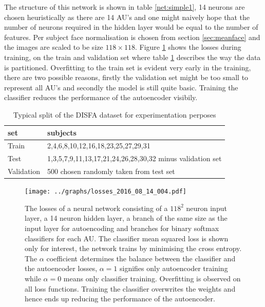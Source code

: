     The structure of this network is shown in table \ref{net:simple1}, 14 neurons
    are chosen heuristically as there are 14 AU's and one might naively hope that the number of
    neurons required in the hidden layer would be equal to the number of features. Per subject face normalisation
    is chosen from section \ref{sec:meanface} and the images are scaled to be size $118 \times 118$.
    Figure \ref{fig:simple} shows the losses during training, on the train and validation set where table \ref{tab:splitting}
    describes the way the data is partitioned. Overfitting to the train set is evident very early in the training, there are two
    possible reasons, firstly the validation set might be too small to represent all AU's and secondly the model is still quite basic.
    Training the classifier reduces the performance of the autoencoder visibily.

    \begin{table}[h!]
      \centering
      {\footnotesize
      \begin{tabular}{|l|l|}
      \hline
      set & subjects   \\
      \hline
       Train          & 2,4,6,8,10,12,16,18,23,25,27,29,31      \\
      \hline
      Test      & 1,3,5,7,9,11,13,17,21,24,26,28,30,32 minus validation set     \\
      \hline
      Validation           & 500 chosen randomly taken from test set      \\
     \hline
      \end{tabular}
      \caption{Typical split of the DISFA dataset for experimentation perposes}
      \label{tab:splitting}  }
    \end{table}


    \begin{figure}[!h]
    \centering
    \texttt{[image: ../graphs/losses\_2016\_08\_14\_004.pdf]}
    \caption{The losses of a neural network consisting of a $118^2$ neuron input layer, a 14
    neuron hidden layer, a branch of the same size as the input layer for autoencoding
    and branches for binary softmax classifiers for each AU. The classifier mean
    squared loss is shown only for interest, the network trains by minimising
    the cross entropy. The $\alpha$ coefficient determines the balance between the
    classifier and the autoencoder losses, $\alpha=1$ signifies only autoencoder training
    while $\alpha=0$ means only classifier training. Overfitting is observed
    on all loss functions. Training the classifier
    overwrites the weights and hence ends up reducing
    the performance of the autoencoder.}
    \label{fig:simple}
    \end{figure}

